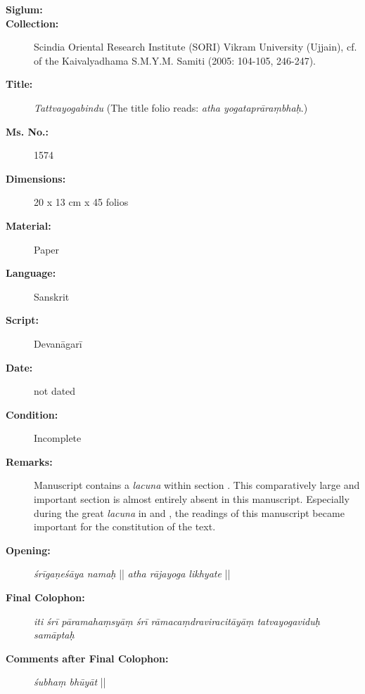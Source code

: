 \begin{description}
\item[\textbf{Siglum:}] \Huge{} \nocite{ytbu1}
\item[\textbf{Collection:}] Scindia Oriental Research Institute (SORI) Vikram University (Ujjain), cf.  of the Kaivalyadhama S.M.Y.M. Samiti (2005: 104-105, 246-247). 
\item[\textbf{Title:}] \emph{Tattvayogabindu} (The title folio reads: \textit{atha yogataprāraṃbhaḥ}.)
\item[\textbf{Ms. No.:}] 1574
\item[\textbf{Dimensions:}] 20 x 13 cm x 45 folios   
\item[\textbf{Material:}] Paper
\item[\textbf{Language:}] Sanskrit
\item[\textbf{Script:}] Devanāgarī
\item[\textbf{Date:}] not dated 
\item[\textbf{Condition:}] Incomplete
\item[\textbf{Remarks:}] Manuscript  contains a \textit{lacuna} within section . This comparatively large and important section is almost entirely absent in this manuscript. Especially during the great \textit{lacuna} in  and , the readings of this manuscript became important for the constitution of the text.     
\item[\textbf{Opening:}] \textit{śrīgaṇeśāya namaḥ} || \textit{atha rājayoga likhyate} ||     
\item[\textbf{Final Colophon:}] \textit{iti śrī pāramahaṃsyāṃ śrī rāmacaṃdraviracitāyāṃ tatvayogaviduḥ samāptaḥ} 
\item[\textbf{Comments after Final Colophon:}] \textit{śubhaṃ bhūyāt} ||
\end{description}
\newpage
